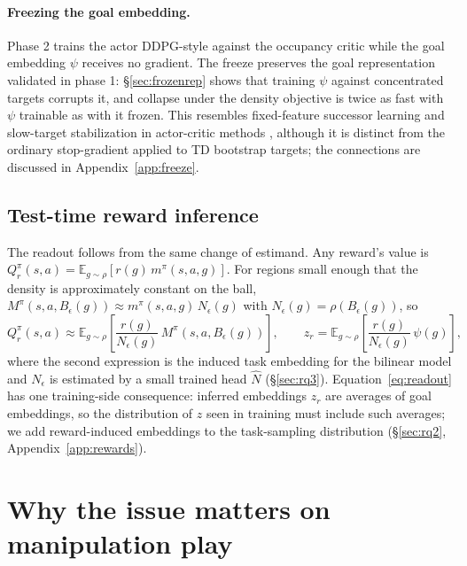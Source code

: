 \documentclass{article}
\newcommand{\E}{\mathbb{E}}
\newcommand{\Nhat}{\hat N}
\begin{document}
\paragraph{Freezing the goal embedding.}
Phase 2 trains the actor DDPG-style against the occupancy critic while the goal embedding $\psi$ receives no gradient.
The freeze preserves the goal representation validated in phase 1: \S\ref{sec:frozenrep} shows that training $\psi$ against concentrated targets corrupts it, and collapse under the density objective is twice as fast with $\psi$ trainable as with it frozen.
This resembles fixed-feature successor learning \citep{barreto2017successor} and slow-target stabilization in actor-critic methods \citep{lillicrap2016continuous}, although it is distinct from the ordinary stop-gradient applied to TD bootstrap targets; the connections are discussed in Appendix~\ref{app:freeze}.

\subsection{Test-time reward inference}
\label{sec:readout}

The readout follows from the same change of estimand.
Any reward's value is $Q_r^{\pi}(s,a)=\E_{g\sim\rho}[r(g)\,m^{\pi}(s,a,g)]$.
For regions small enough that the density is approximately constant on the ball, $M^{\pi}(s,a,B_\epsilon(g))\approx m^{\pi}(s,a,g)\,N_\epsilon(g)$ with $N_\epsilon(g)=\rho(B_\epsilon(g))$, so
\begin{equation}
\label{eq:readout}
Q_r^{\pi}(s,a) \approx \E_{g\sim\rho}\!\left[\frac{r(g)}{N_\epsilon(g)}\, M^{\pi}(s,a,B_\epsilon(g))\right], \qquad z_r=\E_{g\sim\rho}\!\left[\frac{r(g)}{N_\epsilon(g)}\,\psi(g)\right],
\end{equation}
where the second expression is the induced task embedding for the bilinear model and $N_\epsilon$ is estimated by a small trained head $\Nhat$ (\S\ref{sec:rq3}).
Equation~\ref{eq:readout} has one training-side consequence: inferred embeddings $z_r$ are averages of goal embeddings, so the distribution of $z$ seen in training must include such averages; we add reward-induced embeddings to the task-sampling distribution (\S\ref{sec:rq2}, Appendix~\ref{app:rewards}).

\section{Why the issue matters on manipulation play}
\label{sec:playdata}
\end{document}

